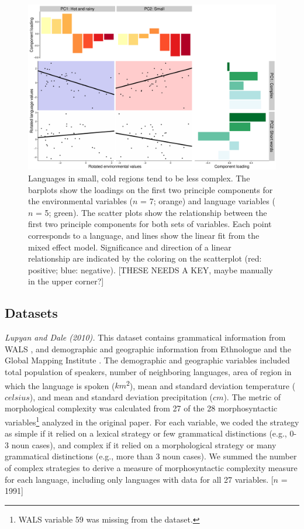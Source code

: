 \documentclass[10pt,letterpaper]{article}
\begin{document}
\begin{figure}[t]
\begin{center}
\includegraphics[scale = .35]{figs/plot2.pdf}
\end{center}
\vspace{-.5em}
\caption{Languages in small, cold regions tend to be less complex. The barplots show the loadings on the first two principle components for the environmental variables ($n$ = 7; orange) and language variables ($n$ = 5; green). The scatter plots show the relationship between the first two principle components for both sets of variables. Each point corresponds to a language, and lines show the linear fit from the mixed effect model. Significance and direction of a linear relationship are indicated by the coloring on the scatterplot (red: positive; blue: negative).  [THESE NEEDS A KEY, maybe manually in the upper corner?] }
\label{fig:cbias}
\vspace{-1em}
\end{figure}

\subsection{Datasets}
{\it Lupyan and Dale (2010).} This dataset contains grammatical information from WALS \cite{wals}, and demographic and geographic information from Ethnologue and the Global Mapping Institute \cite{gordon2005,gmi}. The demographic and geographic variables included total population of speakers, number of neighboring languages, area of region in which the language is spoken ($km$\textsuperscript{2}), mean and standard deviation temperature ($celsius$), and mean and standard deviation precipitation ($cm$). The metric of morphological complexity was calculated from  27 of the 28 morphosyntactic variables\footnote{WALS variable 59 was missing from the dataset.} analyzed in the original paper. For each variable, we coded the strategy as simple if it relied on a lexical strategy or few grammatical distinctions (e.g.,  0-3 noun cases), and complex if it relied on a morphological strategy or many grammatical distinctions (e.g.,  more than 3 noun cases). We summed the number of complex strategies to derive a measure of morphosyntactic complexity measure for each language, including only languages with data for all 27 variables. [$n$ = 1991] 
\end{document}

